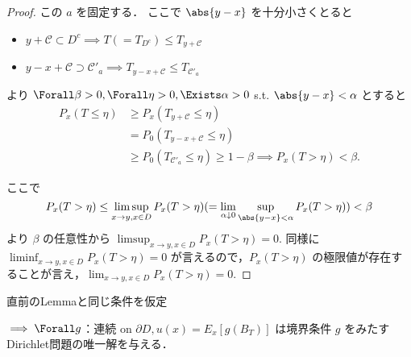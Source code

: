 \documentclass{jsarticle}
\begin{document}
\begin{proof}
    この $a$ を固定する．
    ここで $\abs{y-x}$ を十分小さくとると
    \begin{itemize}
        \item 
        $y+\mathcal{C}\subset D^c\implies T(=T_{D^c})\le T_{y+\mathcal{C}}$
        \item
        $y-x+\mathcal{C}\supset \mathcal{C}'_a\implies T_{y-x+\mathcal{C}}\le T_{\mathcal{C}'_a}$
    \end{itemize}
     より $\Forall \beta>0, \Forall \eta>0, \Exists \alpha>0$ s.t. $\abs{y-x}<\alpha$ とすると
     \begin{align}
         P_x(T\le\eta)
         &\ge P_x(T_{y+\mathcal{C}}\le\eta) \\
         &= P_0(T_{y-x+\mathcal{C}}\le\eta) \\
         &\ge P_0(T_{\mathcal{C}'_a}\le\eta)
         \ge 1-\beta
         \implies P_x(T>\eta)<\beta.
     \end{align}

     ここで
     $$
     P_x(T>\eta)
     \le \limsup_{x\to y, x\in D}P_x(T>\eta)
     (= \lim_{\alpha\downarrow0}\sup_{\abs{y-x}<\alpha}P_x(T>\eta))
     <\beta
     $$
     より $\beta$ の任意性から $\limsup_{x\to y, x\in D}P_x(T>\eta)=0.$
     同様に $\liminf_{x\to y, x\in D}P_x(T>\eta)=0$ が言えるので，$P_x(T>\eta)$ の極限値が存在することが言え，$\lim_{x\to y, x\in D}P_x(T>\eta)=0.$
\end{proof}


\begin{shadebox}
    \setcounter{thm}{7}
    \begin{thm}[Dirichlet問題の解]\label{thm:708}
        直前のLemmaと同じ条件を仮定
        
        $\implies \Forall g$：連続 on $\partial D, u(x) = E_x[g(B_T)]$ は境界条件 $g$ をみたすDirichlet問題の唯一解を与える．
    \end{thm}
\end{shadebox}
\end{document}
